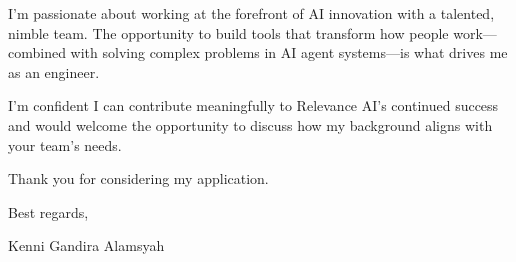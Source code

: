 \documentclass[11pt]{article}
\begin{document}
\vspace{8pt}

I'm passionate about working at the forefront of AI innovation with a talented, nimble team. The opportunity to build tools that transform how people work---combined with solving complex problems in AI agent systems---is what drives me as an engineer.

\vspace{8pt}

I'm confident I can contribute meaningfully to Relevance AI's continued success and would welcome the opportunity to discuss how my background aligns with your team's needs.

\vspace{8pt}

Thank you for considering my application.

\vspace{12pt}

Best regards,

\vspace{8pt}

Kenni Gandira Alamsyah
\end{document}
